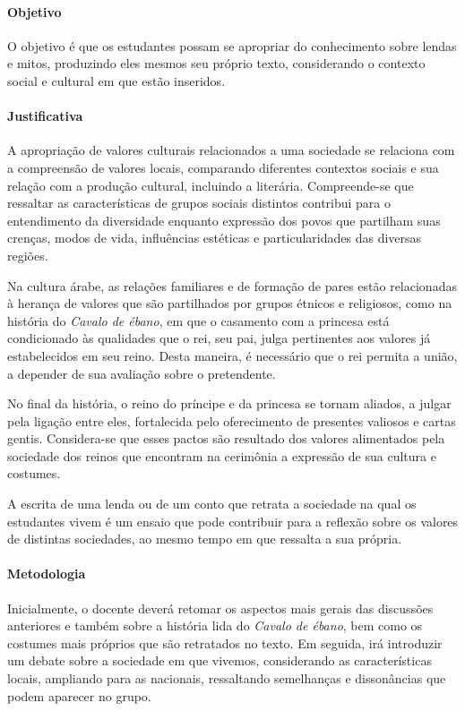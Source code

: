 \documentclass[11pt]{extarticle}
\begin{document}
\paragraph{Objetivo} O objetivo é que os estudantes possam se apropriar do conhecimento sobre lendas e mitos, produzindo eles mesmos seu próprio texto, considerando o contexto social e cultural em que estão inseridos.

\paragraph{Justificativa} A apropriação de valores culturais relacionados a uma sociedade se relaciona com a compreensão de valores locais, comparando diferentes contextos sociais e sua relação com a produção cultural, incluindo a literária. Compreende-se que ressaltar as características de grupos sociais distintos contribui para o entendimento da diversidade enquanto expressão dos povos que partilham suas crenças, modos de vida, influências estéticas e particularidades das diversas regiões.

Na cultura árabe, as relações familiares e de formação de pares estão relacionadas à herança de valores que são partilhados por grupos étnicos e religiosos,  como na história do \textit{Cavalo de ébano}, em que o casamento com a princesa está condicionado às qualidades que o rei, seu pai, julga pertinentes aos valores já estabelecidos em seu reino. Desta maneira, é necessário que o rei permita a união, a depender de sua avaliação sobre o pretendente.

No final da história, o reino do príncipe e da princesa se tornam aliados, a julgar pela ligação entre eles, fortalecida pelo oferecimento de presentes valiosos e cartas gentis. Considera-se que esses pactos são resultado dos valores alimentados pela sociedade dos reinos que encontram na cerimônia a expressão de sua cultura e costumes.

A escrita de uma lenda ou de um conto que retrata a sociedade na qual os estudantes vivem é um ensaio que pode contribuir para a reflexão sobre os valores de distintas sociedades, ao mesmo tempo em que ressalta a sua própria.

\paragraph{Metodologia} Inicialmente, o docente deverá retomar os aspectos mais gerais das discussões anteriores e também sobre a história lida do \textit{Cavalo de ébano}, bem como os costumes mais próprios que são retratados no texto. Em seguida, irá introduzir um debate sobre a sociedade em que vivemos, considerando as características locais, ampliando para as nacionais, ressaltando semelhanças e dissonâncias que podem aparecer no grupo. 
\end{document}
